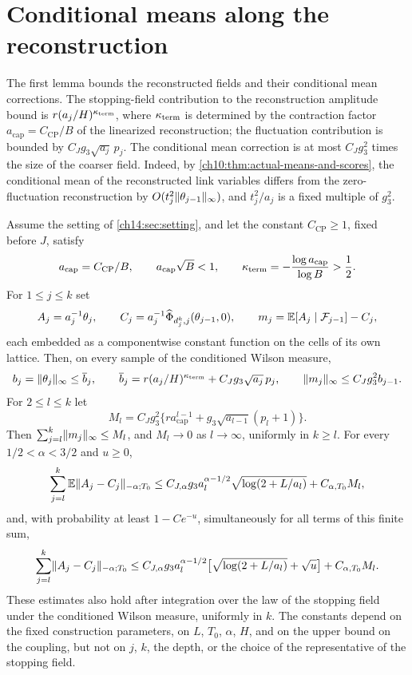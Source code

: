 \section{Conditional means along the reconstruction}\label{ch14:sec:means}

The first lemma bounds the reconstructed fields and their conditional mean corrections. The stopping-field contribution to the reconstruction amplitude bound is $r(a_j/H)^{\kappa_{\mathrm{term}}}$, where $\kappa_{\mathrm{term}}$ is determined by the contraction factor $a_{\mathrm{cap}}=C_{\mathrm{CP}}/B$ of the linearized reconstruction; the fluctuation contribution is bounded by $C_Jg_3\sqrt{a_j}\,p_j$. The conditional mean correction is at most $C_Jg_3^2$ times the size of the coarser field. Indeed, by \cref{ch10:thm:actual-means-and-scores}, the conditional mean of the reconstructed link variables differs from the zero-fluctuation reconstruction by $O(t_j^2\lVert \theta_{j-1}\rVert_\infty)$, and $t_j^2/a_j$ is a fixed multiple of $g_3^2$.

\begin{lemma}\label{ch14:lem:backward-caps-and-means}
Assume the setting of \cref{ch14:sec:setting}, and let the constant $C_{\mathrm{CP}}\ge1$, fixed before $J$, satisfy
\[
 a_{\mathrm{cap}}=C_{\mathrm{CP}}/B,\qquad a_{\mathrm{cap}}\sqrt B<1,\qquad\kappa_{\mathrm{term}}=-\frac{\log a_{\mathrm{cap}}}{\log B}>\frac12.
\]
For $1\le j\le k$ set
\[
 A_j=a_j^{-1}\theta_j,\qquad C_j=a_j^{-1}\widehat\Phi_{d_j^k,j}(\theta_{j-1},0),\qquad m_j=\mathbb E[A_j\mid\mathcal F_{j-1}]-C_j,
\]
each embedded as a componentwise constant function on the cells of its own lattice. Then, on every sample of the conditioned Wilson measure,
\[
 b_j=\lVert \theta_j\rVert_\infty\le\overline b_j,\qquad\overline b_j=r(a_j/H)^{\kappa_{\mathrm{term}}}+C_Jg_3\sqrt{a_j}\,p_j,\qquad\lVert m_j\rVert_\infty\le C_Jg_3^2b_{j-1}.
\]
For $2\le l\le k$ let
\[
 M_l=C_Jg_3^2\bigl\{ra_{\mathrm{cap}}^{l-1}+g_3\sqrt{a_{l-1}}(p_l+1)\bigr\}.
\]
Then $\sum_{j=l}^k\lVert m_j\rVert_\infty\le M_l$, and $M_l\to0$ as $l\to\infty$, uniformly in $k\ge l$. For every $1/2<\alpha<3/2$ and $u\ge0$,
\[
 \sum_{j=l}^k\mathbb E\lVert A_j-C_j\rVert_{-\alpha;T_0}\le C_{J,\alpha}g_3a_l^{\alpha-1/2}\sqrt{\log(2+L/a_l)}+C_{\alpha,T_0}M_l,
\]
and, with probability at least $1-Ce^{-u}$, simultaneously for all terms of this finite sum,
\[
 \sum_{j=l}^k\lVert A_j-C_j\rVert_{-\alpha;T_0}\le C_{J,\alpha}g_3a_l^{\alpha-1/2}\bigl[\sqrt{\log(2+L/a_l)}+\sqrt u\bigr]+C_{\alpha,T_0}M_l.
\]
These estimates also hold after integration over the law of the stopping field under the conditioned Wilson measure, uniformly in $k$. The constants depend on the fixed construction parameters, on $L$, $T_0$, $\alpha$, $H$, and on the upper bound on the coupling, but not on $j$, $k$, the depth, or the choice of the representative of the stopping field.
\end{lemma}

